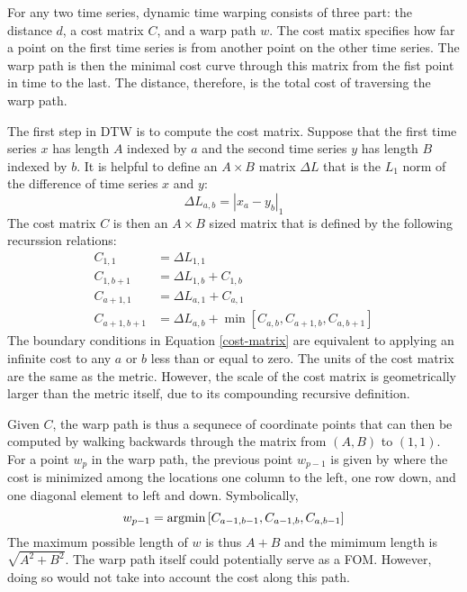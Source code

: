 For any two time series, dynamic time warping consists of three part:
the distance $d$, a cost matrix $C$, and a warp path $w$. The cost matix 
specifies how far a point on the first time series is from another point on the 
other time series.  The warp path is then the minimal cost curve through this 
matrix from the fist point in time to the last. The distance, therefore, is the
total cost of traversing the warp path.

The first step in DTW is to compute the cost matrix. Suppose that the first 
time series $x$ has length $A$ indexed by $a$ and the second time series $y$ has 
length $B$ indexed by $b$. It is helpful to define an $A\times B$ matrix $\Delta L$
that is the $L_1$ norm of the difference of time series $x$ and $y$:
\begin{equation}
\label{delta-l1}
\Delta L_{a,b} = \left|x_a - y_b\right|_1
\end{equation}
The cost matrix $C$ is then an $A\times B$ sized matrix that is defined by the 
following recurssion relations:
\begin{equation}
\label{cost-matrix}
\begin{split}
C_{1,1} & = \Delta L_{1,1}\\
C_{1,b+1} & = \Delta L_{1,b} + C_{1,b}\\
C_{a+1,1} & = \Delta L_{a,1} + C_{a,1}\\
C_{a+1,b+1} & = \Delta L_{a,b} + \min\left[C_{a,b}, C_{a+1,b}, C_{a,b+1}\right]
\end{split}
\end{equation}
The boundary conditions in Equation \ref{cost-matrix} are equivalent 
to applying an infinite cost to any $a$ or $b$ less than or equal to zero.
The units of the cost matrix are the same as the metric. However, the 
scale of the cost matrix is geometrically larger than the metric itself,
due to its compounding recursive definition.

Given $C$, the warp path is thus a sequnece of coordinate points that can then be 
computed by walking backwards through the matrix from $(A, B)$ to $(1, 1)$.
For a point $w_p$ in the warp path, the previous point $w_{p-1}$ is given by 
where the cost is minimized among the locations one column to the left, one row
down, and one diagonal element to left and down. Symbolically, 
\begin{equation}
\label{warp-path}
w_{p-1} = \mathrm{argmin}\left[C_{a-1,b-1}, C_{a-1,b}, C_{a,b-1}\right]
\end{equation}
The maximum possible length of $w$ is thus $A + B$ and the mimimum length is 
$\sqrt{A^2 + B^2}$. The warp path itself could potentially serve as a FOM.  
However, doing so would not take into account the cost along this path.

